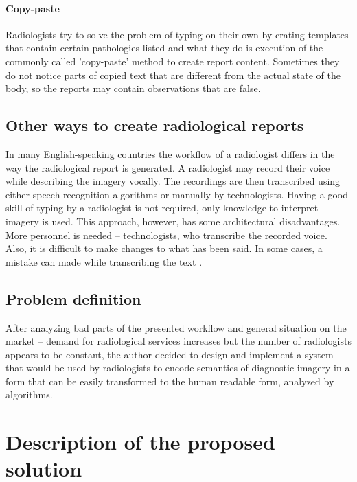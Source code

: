 \documentclass[12pt, twoside, openany]{report}
\theoremstyle{definition}
\begin{document}
\subsubsection{Copy-paste}
Radiologists try to solve the problem of typing on their own by crating templates that contain certain pathologies listed and what they do is execution of the commonly called 'copy-paste' method to create report content. Sometimes they do not notice parts of copied text that are different from the actual state of the body, so the reports may contain observations that are false. 

\section{Other ways to create radiological reports}
In many English-speaking countries the workflow of a radiologist differs in the way the radiological report is generated. A radiologist may record their voice while describing the imagery vocally. The recordings are then transcribed using either speech recognition algorithms or manually by technologists. Having a good skill of typing by a radiologist is not required, only knowledge to interpret imagery is used. This approach, however, has some architectural disadvantages. More personnel is needed -- technologists, who transcribe the recorded voice\cite{speech-impact}. Also, it is difficult to make changes to what has been said. In some cases, a mistake can made while transcribing the text \cite{speech-africa}.

\section{Problem definition}

After analyzing bad parts of the presented workflow and general situation on the market -- demand for radiological services increases but the number of radiologists appears to be constant, the author decided to design and implement a system that would be used by radiologists to encode semantics of diagnostic imagery in a form that can be easily transformed to the human readable form, analyzed by algorithms. 









\chapter{Description of the proposed solution}
\end{document}
